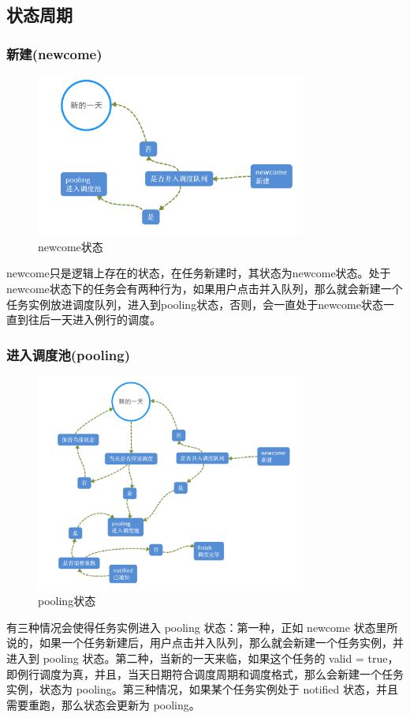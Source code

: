 ﻿\documentclass[a4paper]{report}
\begin{document}
\subsection{状态周期} %
\subsubsection{新建(newcome)} %
\begin{figure}[htbp]
\centering\includegraphics[width=3.5in]{newcome.png}
\caption{newcome状态}
\end{figure}
newcome只是逻辑上存在的状态，在任务新建时，其状态为newcome状态。处于newcome状态下的任务会有两种行为，如果用户点击并入队列，那么就会新建一个任务实例放进调度队列，进入到pooling状态，否则，会一直处于newcome状态一直到往后一天进入例行的调度。

\subsubsection{进入调度池(pooling)} %
\begin{figure}[htbp]
\centering\includegraphics[width=3.5in]{pooling.png}
\caption{pooling状态}
\end{figure}
有三种情况会使得任务实例进入 pooling 状态：第一种，正如 newcome 状态里所说的，如果一个任务新建后，用户点击并入队列，那么就会新建一个任务实例，并进入到 pooling 状态。第二种，当新的一天来临，如果这个任务的 valid = true，即例行调度为真，并且，当天日期符合调度周期和调度格式，那么会新建一个任务实例，状态为 pooling。第三种情况，如果某个任务实例处于 notified 状态，并且需要重跑，那么状态会更新为 pooling。
\end{document}
